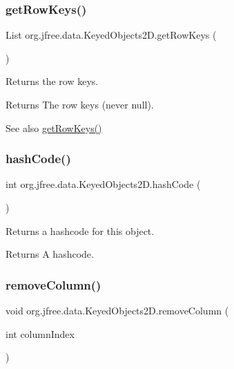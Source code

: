 \subsubsection{\texorpdfstring{get\+Row\+Keys()}{getRowKeys()}}
{\footnotesize\ttfamily List org.\+jfree.\+data.\+Keyed\+Objects2\+D.\+get\+Row\+Keys (\begin{DoxyParamCaption}{ }\end{DoxyParamCaption})}

Returns the row keys.

\begin{DoxyReturn}{Returns}
The row keys (never {\ttfamily null}).
\end{DoxyReturn}
\begin{DoxySeeAlso}{See also}
\mbox{\hyperlink{classorg_1_1jfree_1_1data_1_1_keyed_objects2_d_ac800d5499d80a223b6f82adadda2066e}{get\+Row\+Keys()}} 
\end{DoxySeeAlso}
\mbox{\label{classorg_1_1jfree_1_1data_1_1_keyed_objects2_d_a7b1a3d222d8fbb68771ec0d895bb4efb}} 
\subsubsection{\texorpdfstring{hash\+Code()}{hashCode()}}
{\footnotesize\ttfamily int org.\+jfree.\+data.\+Keyed\+Objects2\+D.\+hash\+Code (\begin{DoxyParamCaption}{ }\end{DoxyParamCaption})}

Returns a hashcode for this object.

\begin{DoxyReturn}{Returns}
A hashcode. 
\end{DoxyReturn}
\mbox{\label{classorg_1_1jfree_1_1data_1_1_keyed_objects2_d_a5c8fb22f412dab0f50a762d2676818d3}} 
\subsubsection{\texorpdfstring{remove\+Column()}{removeColumn()}\hspace{0.1cm}{\footnotesize\ttfamily [1/2]}}
{\footnotesize\ttfamily void org.\+jfree.\+data.\+Keyed\+Objects2\+D.\+remove\+Column (\begin{DoxyParamCaption}\item[{int}]{column\+Index }\end{DoxyParamCaption})}

